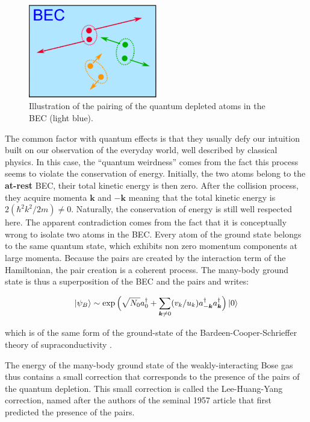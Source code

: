 \begin{figure}
    \centering
    \includegraphics[width=0.5\textwidth]{Fig/Chapter1/pairs.png}
    \caption[Illustration of the \kmk pairing of the quantum depleted atoms in the BEC]{Illustration of the \kmk pairing of the quantum depleted atoms in the BEC (light blue).}
    \label{fig:bec_pairs}
\end{figure}

The common factor with quantum effects is that they usually defy our intuition built on our observation of the everyday world, well described by classical physics. In this case, the ``quantum weirdness'' comes from the fact this process seems to violate the conservation of energy. Initially, the two atoms belong to the \textbf{at-rest} BEC, their total kinetic energy is then zero. After the collision process, they acquire momenta $\bm{k}$ and $-\bm{k}$ meaning that the total kinetic energy is $2 (\hbar^2 k^2/2m) \neq 0$. Naturally, the conservation of energy is still well respected here. The apparent contradiction comes from the fact that it is conceptually wrong to isolate two atoms in the BEC. Every atom of the ground state belongs to the same quantum state, which exhibits non zero momentum components at large momenta. Because the pairs are created by the interaction term of the Hamiltonian, the pair creation is a coherent process. The many-body ground state is thus a superposition of the BEC and the pairs and writes:

\begin{equation}
     \ket{\psi_B} \sim \exp \Big(\sqrt{N_0} a^{\dagger}_0 + \sum_{\bm{k} \neq 0} (v_k/u_k) a^{\dagger}_{-\bm{k}} a^{\dagger}_{\bm{k}} \Big) \ket{0}
     \label{eq:ground_state}
\end{equation}

\noindent which is of the same form of the ground-state of the Bardeen-Cooper-Schrieffer theory of supraconductivity \cite{BCS1957}. 

The energy of the many-body ground state of the weakly-interacting Bose gas thus contains a small correction that corresponds to the presence of the \kmk pairs of the quantum depletion. This small correction is called the Lee-Huang-Yang correction, named after the authors of the seminal 1957 article \cite{lee1957} that first predicted the presence of the \kmk pairs. 

